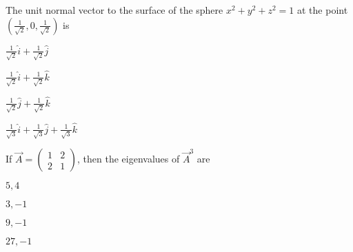 \item The unit normal vector to the surface of the sphere $x^2 + y^2 + z^2 = 1$ at the point $\left(\frac{1}{\sqrt{2}}, 0, \frac{1}{\sqrt{2}}\right)$ is
\hfill{}
\begin{enumerate}
\begin{multicols}{4}
    \item$\frac{1}{\sqrt{2}} \hat{i} + \frac{1}{\sqrt{2}} \hat{j}$
    \item $\frac{1}{\sqrt{2}} \hat{i} + \frac{1}{\sqrt{2}} \hat{k}$
    \item $\frac{1}{\sqrt{2}} \hat{j} + \frac{1}{\sqrt{2}} \hat{k}$
    \item $\frac{1}{\sqrt{3}} \hat{i} + \frac{1}{\sqrt{3}} \hat{j} + \frac{1}{\sqrt{3}} \hat{k}$
\end{multicols}
\end{enumerate}

\item If $\vec{A} = \begin{pmatrix} 1 & 2 \\ 2 & 1 \end{pmatrix}$, then the eigenvalues of $\vec{A}^3$ are
\hfill{}
\begin{enumerate}
\begin{multicols}{4}
\item $5, 4$
\item $3, -1$
\item $9, -1$
\item $27, -1$
\end{multicols}
\end{enumerate}

